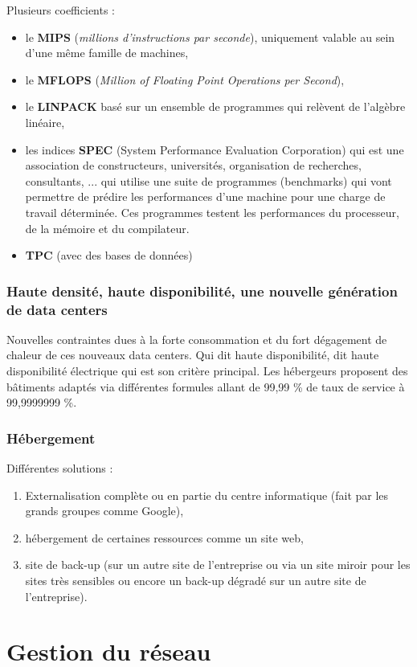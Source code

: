 \documentclass[10pt,a4paper,oneside,titlepage]{report}
\begin{document}
Plusieurs coefficients : \begin{itemize}
\item le \textbf{MIPS} (\textit{millions d'instructions par seconde}), uniquement valable au sein d'une m\^eme famille de machines,
\item le \textbf{MFLOPS} (\textit{Million of Floating Point Operations per Second}),
\item le \textbf{LINPACK} basé sur un ensemble de programmes qui relèvent de l'algèbre linéaire,
\item les indices \textbf{SPEC} (System Performance Evaluation Corporation) qui est une association de constructeurs, universités, organisation de recherches, consultants, ... qui utilise une suite de programmes (benchmarks) qui vont permettre de
prédire les performances d'une machine pour une charge de travail déterminée. Ces programmes testent les performances du processeur, de la mémoire et du compilateur.
\item \textbf{TPC} (avec des bases de données)
\end{itemize}

\subsubsection{Haute densité, haute disponibilité, une nouvelle génération de data centers}

Nouvelles contraintes dues à la forte consommation et du fort dégagement de chaleur de ces nouveaux data centers. Qui dit haute disponibilité, dit haute disponibilité électrique qui est son critère principal. Les hébergeurs proposent des b\^atiments adaptés via différentes formules allant de 99,99 \% de taux de service à 99,9999999 \%.

\subsubsection{Hébergement}

Différentes solutions :
\begin{enumerate}
\item Externalisation complète ou en partie du centre informatique (fait par les grands groupes comme Google),
\item hébergement de certaines ressources comme un site web,
\item site de back-up (sur un autre site de l'entreprise ou via un site miroir pour les sites très sensibles ou encore un back-up dégradé sur un autre site de l'entreprise).
\end{enumerate}

\section{Gestion du réseau}
\end{document}
